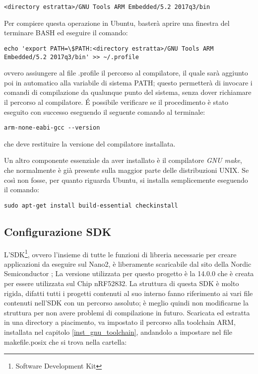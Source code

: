 \begin{verbatim}
<directory estratta>/GNU Tools ARM Embedded/5.2 2017q3/bin
\end{verbatim}

Per compiere questa operazione in Ubuntu, basterà aprire una finestra del terminare BASH ed eseguire il comando:

\begin{verbatim}
echo 'export PATH=\$PATH:<directory estratta>/GNU Tools ARM Embedded/5.2 2017q3/bin' >> ~/.profile 
\end{verbatim}

ovvero assiungere al file .profile il percorso al compilatore, il quale sarà aggiunto poi in automatico alla variabile di sistema PATH; questo permetterà di invocare i comandi di compilazione da qualunque punto del sistema, senza dover richiamare il percorso al compilatore.
\'E possibile verificare se il procedimento è stato eseguito con successo eseguendo il seguente comando al terminale:

\begin{verbatim}
arm-none-eabi-gcc --version
\end{verbatim}
che deve restituire la versione del compilatore installata.

Un altro componente essenziale da aver installato è il compilatore \emph{GNU make}, che normalmente è già presente sulla maggior parte delle distribuzioni UNIX. Se così non fosse, per quanto riguarda Ubuntu, si installa semplicemente eseguendo il comando:

\begin{verbatim}
sudo apt-get install build-essential checkinstall
\end{verbatim}

\subsection{Configurazione SDK}
L'SDK\footnote{Software Development Kit}, ovvero l'insieme di tutte le funzioni di libreria necessarie per creare applicazioni da eseguire sul Nano2, è liberamente scaricabile dal sito della Nordic Semiconductor \cite{sdkweb} ; La versione utilizzata per questo progetto è la 14.0.0 che è creata per essere utilizzata sul Chip nRF52832.
La struttura di questa SDK è molto rigida, difatti tutti i progetti contenuti al suo interno fanno riferimento ai vari file contenuti nell'SDK con un percorso assoluto; è meglio quindi non modificarne la struttura per non avere problemi di compilazione in futuro.
Scaricata ed estratta in una directory a piacimento, va impostato il percorso alla toolchain ARM, installata nel capitolo \ref{inst_gnu_toolchain}, andandolo a impostare nel file makefile.posix che si trova nella cartella: 

